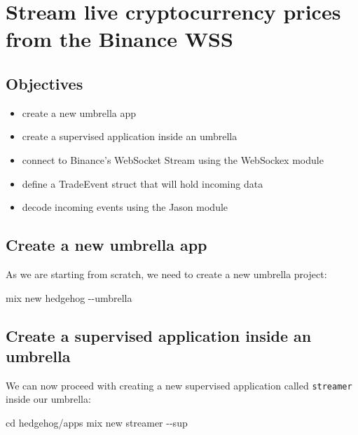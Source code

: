 \documentclass[
  oneside]{book}
\newenvironment{Shaded}{\begin{snugshade}}{\end{snugshade}}
\newcommand{\AttributeTok}[1]{\textcolor[rgb]{0.13,0.29,0.53}{#1}}
\newcommand{\BuiltInTok}[1]{#1}
\newcommand{\ExtensionTok}[1]{#1}
\newcommand{\NormalTok}[1]{#1}
\providecommand{\tightlist}{%
  \setlength{\itemsep}{0pt}\setlength{\parskip}{0pt}}
\begin{document}
\chapter{Stream live cryptocurrency prices from the Binance WSS}\label{stream-live-cryptocurrency-prices-from-the-binance-wss}

\section{Objectives}\label{objectives}

\begin{itemize}
\tightlist
\item
  create a new umbrella app
\item
  create a supervised application inside an umbrella
\item
  connect to Binance's WebSocket Stream using the WebSockex module
\item
  define a TradeEvent struct that will hold incoming data
\item
  decode incoming events using the Jason module
\end{itemize}

\section{Create a new umbrella app}\label{create-a-new-umbrella-app}

As we are starting from scratch, we need to create a new umbrella project:

\begin{Shaded}
\begin{Highlighting}[]
\ExtensionTok{mix}\NormalTok{ new hedgehog }\AttributeTok{{-}{-}umbrella}
\end{Highlighting}
\end{Shaded}

\section{Create a supervised application inside an umbrella}\label{create-a-supervised-application-inside-an-umbrella}

We can now proceed with creating a new supervised application called \texttt{streamer} inside our umbrella:

\begin{Shaded}
\begin{Highlighting}[]
\BuiltInTok{cd}\NormalTok{ hedgehog/apps}
\ExtensionTok{mix}\NormalTok{ new streamer }\AttributeTok{{-}{-}sup}
\end{Highlighting}
\end{Shaded}
\end{document}

